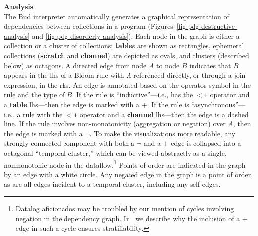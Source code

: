 \noindent
\textbf{Analysis}\\
\noindent
The Bud interpreter automatically generates a graphical
representation of dependencies between collections in a program
(Figures~\ref{fig:pdg-destructive-analysis} and \ref{fig:pdg-disorderly-analysis}).
Each node in the graph is either a collection or a cluster of collections; \textbf{table}s are shown as rectangles, ephemeral
collections (\textbf{scratch} and \textbf{channel}) are depicted as ovals, and clusters (described below) as octagons.  A
directed edge from node $A$ to node $B$ indicates that $B$ appears in the
lhs of a Bloom rule with $A$ referenced directly, or through a join expression,
in the rhs.  An edge is annotated based on the operator symbol in the rule and
the type of $B$.  If the rule is ``inductive''---i.e., has the \texttt{$<$+}
operator and a {\bf table} lhs---then the edge is marked with a $+$.  If the
rule is ``asynchronous''---i.e., a rule with the \texttt{$<$+} operator and a {\bf
channel} lhs---then the edge is a dashed line.  If the rule involves
non-monotonicity (aggregation or negation) over $A$, then the edge is marked with a $\lnot$.
To make the visualizations more readable, any strongly connected component with both a $\lnot$ and a $+$ edge is collapsed into a octagonal ``temporal cluster,'' 
which can be viewed abstractly as a single, nonmonotonic node in the 
dataflow.\footnote{Datalog aficionados may be troubled by our mention of cycles
involving negation in the dependency graph.  In~\cite{dedalus-techr} we
describe why the inclusion of a $+$ edge in such a cycle ensures stratifiability.}
Points of order are indicated in the graph by an edge with a white circle.
 Any negated edge in the graph is a point of order, as are all edges incident to a temporal cluster, including any self-edges.


